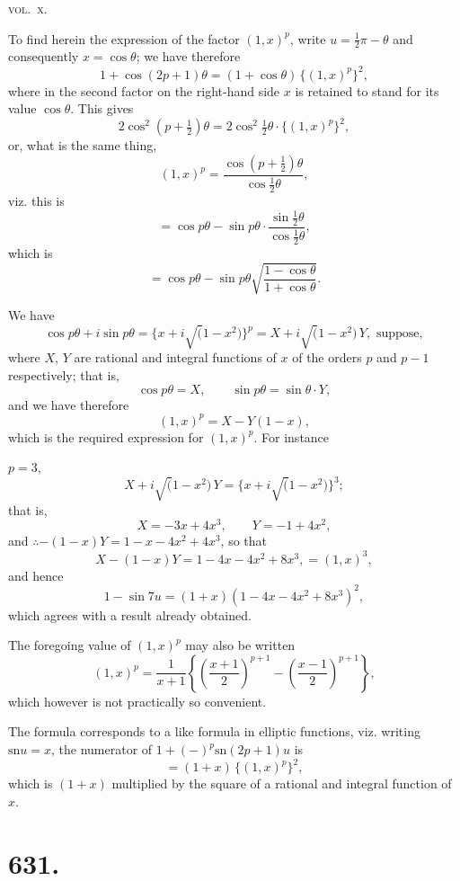 \documentclass[11pt,a4paper]{book}
\providecommand{\sn}{\mathrm{sn}}
\begin{document}
\hfill\textsc{vol.~x.}

\clearpage
\setcounter{page}{2}

To find herein the expression of the factor $(1, x)^p$, write $u = \frac{1}{2}\pi - \theta$ and consequently $x = \cos\theta$; we have therefore
\[
1 + \cos(2p+1)\theta = (1+\cos\theta)\,\{(1, x)^p\}^2,
\]
where in the second factor on the right-hand side $x$ is retained to stand for its value $\cos\theta$. This gives
\[
2\cos^2\left(p+\tfrac{1}{2}\right)\theta = 2\cos^2\tfrac{1}{2}\theta \cdot \{(1, x)^p\}^2,
\]
or, what is the same thing,
\[
(1, x)^p = \frac{\cos(p+\frac{1}{2})\theta}{\cos\frac{1}{2}\theta},
\]
viz. this is
\[
= \cos p\theta - \sin p\theta \cdot \frac{\sin\frac{1}{2}\theta}{\cos\frac{1}{2}\theta},
\]
which is
\[
= \cos p\theta - \sin p\theta \sqrt{\frac{1-\cos\theta}{1+\cos\theta}}.
\]

We have
\[
\cos p\theta + i\sin p\theta = \{x + i\surd(1-x^2)\}^p = X + i\surd(1-x^2)\, Y, \text{ suppose},
\]
where $X$, $Y$ are rational and integral functions of $x$ of the orders $p$ and $p-1$ respectively; that is,
\[
\cos p\theta = X, \qquad \sin p\theta = \sin\theta \cdot Y,
\]
and we have therefore
\[
(1, x)^p = X - Y(1-x),
\]
which is the required expression for $(1, x)^p$. For instance

$p=3$,
\[
X + i\surd(1-x^2)\, Y = \{x + i\surd(1-x^2)\}^3;
\]
that is,
\[
X = -3x + 4x^3, \qquad Y = -1 + 4x^2,
\]
and $\therefore -(1-x)Y = 1 - x - 4x^2 + 4x^3$, so that
\[
X - (1-x)Y = 1 - 4x - 4x^2 + 8x^3, = (1, x)^3,
\]
and hence
\[
1 - \sin 7u = (1+x)(1 - 4x - 4x^2 + 8x^3)^2,
\]
which agrees with a result already obtained.

The foregoing value of $(1, x)^p$ may also be written
\[
(1, x)^p = \frac{1}{x+1} \left\{ \left( \frac{x+1}{2} \right)^{p+1} - \left( \frac{x-1}{2} \right)^{p+1} \right\},
\]
which however is not practically so convenient.

The formula corresponds to a like formula in elliptic functions, viz. writing $\sn u = x$, the numerator of $1 + (-)^p \sn(2p+1)u$ is
\[
= (1+x)\,\{(1, x)^p\}^2,
\]
which is $(1+x)$ multiplied by the square of a rational and integral function of $x$.

\clearpage
\setcounter{page}{3}

\section*{631.}
\end{document}
